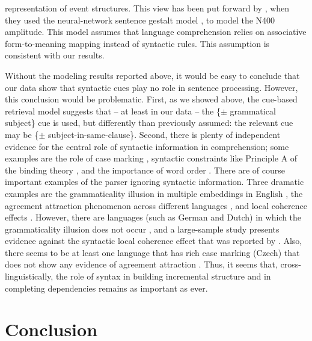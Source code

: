 \documentclass[a4paper, man, floatsintext]{apa7}
\begin{document}
representation of event structures. This view has been put forward by \textcite{rabovsky_etal_2018}, when they used the neural-network sentence gestalt model \parencite{mcclelland1989_sentence_gestalt}, to model the N400 amplitude. This model assumes that language comprehension relies on associative form-to-meaning mapping instead of syntactic rules. This assumption is consistent with our results.

Without the modeling results reported above, it would be easy to conclude that our data show that syntactic cues play no role in sentence processing. However, this conclusion would be problematic. First, as we showed above, the cue-based retrieval model suggests that -- at least in our data -- the \{$\pm$ grammatical subject\} cue is used, but differently than previously assumed: the relevant cue may be \{$\pm$ subject-in-same-clause\}. Second, there is plenty of independent evidence for the central role of syntactic information in comprehension; some examples are the role of case marking \parencite[e.g.,][]{ALV2019,HusainEtAl2014,bhatia2022processing,bader2000case,bader2006case,miyamoto2002case}, syntactic constraints like Principle A of the binding theory \parencite[e.g.,][]{Sturt2003,dillon2013,yadav2021individual},  and 
the importance of word order \parencite[e.g.,][]{meng2000mode}. There are of course important examples of the parser ignoring syntactic information. Three dramatic examples are the grammaticality illusion in multiple embeddings in English \parencite{gibsonthomas99}, the agreement attraction phenomenon across different languages \parencite{wagersetal,lago_etal_2021,jaeger_etal_2017}, and local coherence effects \parencite{taboretal04}.  However, there are languages (such as German and Dutch) in which the grammaticality illusion does not occur \parencite{VSLK11,FrankEtAl2015}, and a large-sample study \parencite{lcpaape2023} presents evidence against the syntactic local coherence effect that was reported by \textcite{taboretal04}. Also, there seems to be at least one language that has rich case marking (Czech) that does not show any evidence of agreement attraction \parencite{chromy2023number}. Thus, it seems that, cross-linguistically, the role of syntax in building incremental structure and in completing dependencies remains as important as ever.

\section{Conclusion}
\end{document}
